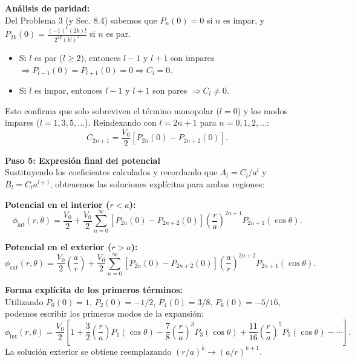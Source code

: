 \documentclass[a4paper]{article}
\begin{document}
\noindent\textbf{Análisis de paridad:}\\
Del Problema 3 (y Sec. 8.4) sabemos que $P_n(0) = 0$ si $n$ es impar, y $P_{2k}(0) = \frac{(-1)^k (2k)!}{2^{2k} (k!)^2}$ si $n$ es par.
\begin{itemize}
    \item Si $l$ es par ($l \geq 2$), entonces $l-1$ y $l+1$ son impares $\Rightarrow P_{l-1}(0) = P_{l+1}(0) = 0 \Rightarrow C_l = 0$.
    \item Si $l$ es impar, entonces $l-1$ y $l+1$ son pares $\Rightarrow C_l \neq 0$.
\end{itemize}
Esto confirma que solo sobreviven el término monopolar ($l=0$) y los modos impares ($l=1, 3, 5, \dots$). Reindexando con $l = 2n+1$ para $n=0, 1, 2, \dots$:
$$
C_{2n+1} = \frac{V_0}{2} \left[ P_{2n}(0) - P_{2n+2}(0) \right].
$$

\vspace{0.3cm}
\noindent\textbf{Paso 5: Expresión final del potencial}\\
Sustituyendo los coeficientes calculados y recordando que $A_l = C_l / a^l$ y $B_l = C_l a^{l+1}$, obtenemos las soluciones explícitas para ambas regiones:

\noindent\textbf{Potencial en el interior ($r < a$):}
$$
\phi_{\text{int}}(r, \theta) = \frac{V_0}{2} + \frac{V_0}{2} \sum_{n=0}^{\infty} \left[ P_{2n}(0) - P_{2n+2}(0) \right] \left( \frac{r}{a} \right)^{2n+1} P_{2n+1}(\cos\theta).
$$

\noindent\textbf{Potencial en el exterior ($r > a$):}
$$
\phi_{\text{ext}}(r, \theta) = \frac{V_0}{2} \left( \frac{a}{r} \right) + \frac{V_0}{2} \sum_{n=0}^{\infty} \left[ P_{2n}(0) - P_{2n+2}(0) \right] \left( \frac{a}{r} \right)^{2n+2} P_{2n+1}(\cos\theta).
$$

\noindent\textbf{Forma explícita de los primeros términos:}\\
Utilizando $P_0(0)=1$, $P_2(0)=-1/2$, $P_4(0)=3/8$, $P_6(0)=-5/16$, podemos escribir los primeros modos de la expansión:
$$
\phi_{\text{int}}(r, \theta) = \frac{V_0}{2} \left[ 1 + \frac{3}{2} \left(\frac{r}{a}\right) P_1(\cos\theta) - \frac{7}{8} \left(\frac{r}{a}\right)^3 P_3(\cos\theta) + \frac{11}{16} \left(\frac{r}{a}\right)^5 P_5(\cos\theta) - \cdots \right].
$$
La solución exterior se obtiene reemplazando $(r/a)^k \to (a/r)^{k+1}$.
\end{document}
